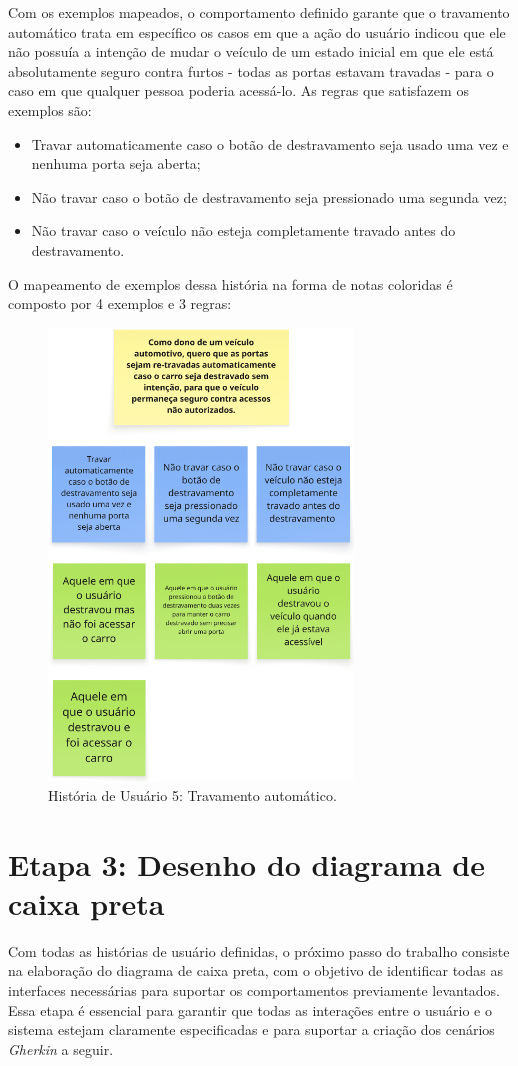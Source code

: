 Com os exemplos mapeados, o comportamento definido garante que o travamento automático trata em específico os casos em que a ação do usuário indicou que ele não possuía a intenção de mudar o veículo de um estado inicial em que ele está absolutamente seguro contra furtos - todas as portas estavam travadas - para o caso em que qualquer pessoa poderia acessá-lo. As regras que satisfazem os exemplos são:

\begin{itemize}
    \item Travar automaticamente caso o botão de destravamento seja usado uma vez e nenhuma porta seja aberta;
    \item Não travar caso o botão de destravamento seja pressionado uma segunda vez;
    \item Não travar caso o veículo não esteja completamente travado antes do destravamento.
\end{itemize}

O mapeamento de exemplos dessa história na forma de notas coloridas é composto por 4 exemplos e 3 regras:

\begin{figure}[H]
\centering
\includegraphics[height=12cm]{figuras/user_story_5.png}
\caption{História de Usuário 5: Travamento automático.}
\label{fig:historia5}
\end{figure}

\section{\textbf{Etapa 3: Desenho do diagrama de caixa preta}}
\label{sbs:etapa3}
Com todas as histórias de usuário definidas, o próximo passo do trabalho consiste na elaboração do diagrama de caixa preta, com o objetivo de identificar todas as 
interfaces necessárias para suportar os comportamentos previamente levantados. Essa etapa é essencial para garantir que todas as interações entre o usuário e o 
sistema estejam claramente especificadas e para suportar a criação dos cenários \textit{Gherkin} a seguir.

